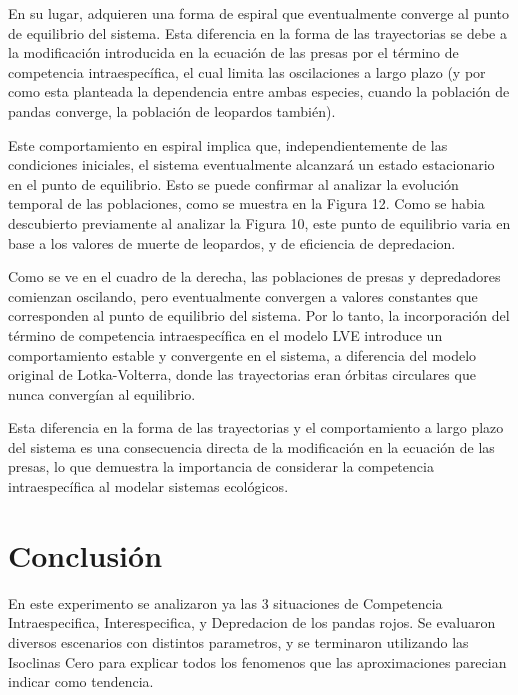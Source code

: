 \documentclass{article}
\begin{document}
\noindent En su lugar, adquieren una forma de espiral que eventualmente converge al punto de equilibrio del sistema. Esta diferencia en la forma de las trayectorias se debe a la modificación introducida en la ecuación de las presas por el término de competencia intraespecífica, el cual limita las oscilaciones a largo plazo (y por como esta planteada la dependencia entre ambas especies, cuando la población de pandas converge, la población de leopardos también). 

\vspace{1\baselineskip}

\noindent Este comportamiento en espiral implica que, independientemente de las condiciones iniciales, el sistema eventualmente alcanzará un estado estacionario en el punto de equilibrio. Esto se puede confirmar al analizar la evolución temporal de las poblaciones, como se muestra en la Figura 12. Como se habia descubierto previamente al analizar la Figura 10, este punto de equilibrio varia en base a los valores de muerte de leopardos, y de eficiencia de depredacion.
\vspace{1\baselineskip}

\noindent Como se ve en el cuadro de la derecha, las poblaciones de presas y depredadores comienzan oscilando, pero eventualmente convergen a valores constantes que corresponden al punto de equilibrio del sistema. Por lo tanto, la incorporación del término de competencia intraespecífica en el modelo LVE introduce un comportamiento estable y convergente en el sistema, a diferencia del modelo original de Lotka-Volterra, donde las trayectorias eran órbitas circulares que nunca convergían al equilibrio.
\vspace{1\baselineskip}

\noindent Esta diferencia en la forma de las trayectorias y el comportamiento a largo plazo del sistema es una consecuencia directa de la modificación en la ecuación de las presas, lo que demuestra la importancia de considerar la competencia intraespecífica al modelar sistemas ecológicos. 
\vspace{1\baselineskip}


\section*{Conclusión}

\noindent En este experimento se analizaron ya las 3 situaciones de Competencia Intraespecifica, Interespecifica, y Depredacion de los pandas rojos. Se evaluaron diversos escenarios con distintos parametros, y se terminaron utilizando las Isoclinas Cero para explicar todos los fenomenos que las aproximaciones parecian indicar como tendencia. \vspace{2\baselineskip}
\end{document}
